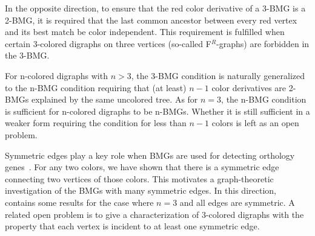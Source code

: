 \documentclass[final,3p,times]{elsarticle}
\begin{document}
In the opposite direction, to ensure that the red color derivative of a 3-BMG is a 2-BMG, it is required that the last common ancestor between every red vertex and its best match be color independent. This requirement is fulfilled when certain 3-colored digraphs on three vertices (so-called F$^R$-graphs) are forbidden in the 3-BMG.

For n-colored digraphs with $n>3$, the 3-BMG condition is naturally generalized to the n-BMG condition requiring that (at least) $n-1$ color derivatives are 2-BMGs explained by the same uncolored tree. As for $n=3$, the n-BMG condition is sufficient for n-colored digraphs to be n-BMGs. Whether it is still sufficient in a weaker form requiring the condition for less than $n-1$ colors is left as an open problem.

Symmetric edges play a key role when BMGs are used for detecting orthology genes~\cite{stadler2020pairs}. For any two colors, we have shown that there is a symmetric edge connecting two vertices of those colors. This motivates a graph-theoretic investigation of the BMGs with many symmetric edges. In this direction, ~\cite{geiss2020reciprocal} contains some results for the case where $n=3$ and all edges are symmetric. A related open problem is to give a characterization of 3-colored digraphs with the property that each vertex is incident to at least one symmetric edge. 




\end{document}
